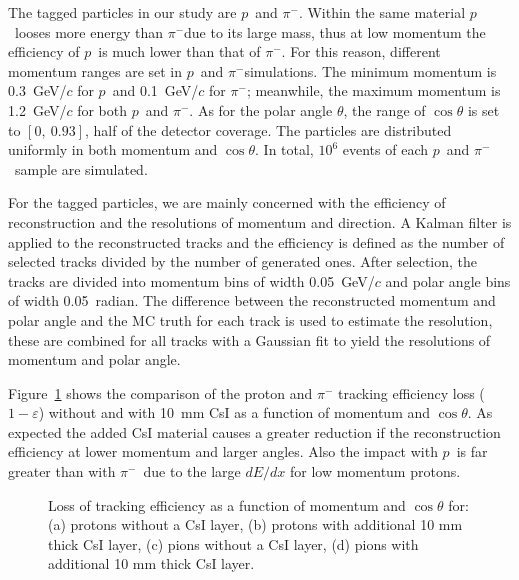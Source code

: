 \documentclass[aps,preprint,showkeys,superscriptaddress]{revtex4}
\newcommand{\pp}{$p$}
\newcommand{\pim}{$\pi^-$}
\begin{document}
The tagged particles in our study are \pp\ and \pim. Within the same material 
\pp\ looses more energy than \pim due to its large mass, thus at low
momentum the efficiency of \pp\ is much lower than that of \pim. For this
reason, different momentum ranges are set in \pp\ and \pim simulations. The
minimum momentum is 0.3~GeV/$c$ for \pp\ and 0.1~GeV/$c$ for \pim; meanwhile,
the maximum momentum is 1.2~GeV/$c$ for both \pp\ and \pim. As for the polar
angle $\theta$, the range of $\cos\theta$ is set to $[0,~0.93]$, half of the
detector coverage. The particles are distributed uniformly in both momentum and
$\cos\theta$. In total, $10^6$ events of each \pp\ and \pim\ sample are
simulated.
        
For the tagged particles, we are mainly concerned with the efficiency of
reconstruction and the resolutions of momentum and direction. A Kalman filter is
applied to the reconstructed tracks and the efficiency is defined as the number
of selected tracks divided by the number of generated ones. After selection,
the tracks are divided into momentum bins of width 0.05~GeV/$c$ 
and polar angle bins of width 0.05~radian.
The difference between the reconstructed momentum and polar angle and the MC truth 
for each track is used to estimate the resolution, these are combined for all 
tracks with a Gaussian fit to yield the resolutions of momentum and polar angle.
        
Figure~\ref{tracking} shows the comparison of the proton and $\pi^-$ tracking
efficiency loss ($1-\varepsilon$) without and with 10~mm CsI as a function of
momentum and $\cos\theta$. As expected the added CsI material 
causes a greater reduction if the reconstruction efficiency at lower momentum 
and larger angles. Also the impact with \pp\ is far greater than with \pim\ 
due to the large $dE/dx$ for low momentum protons.
        
        \begin{figure}[htbp]
        	\centering  %
        	\subfigbottomskip=2pt %
        	\subfigcapskip=-5pt %
        	\caption{ Loss of tracking efficiency as a function of momentum and $\cos\theta$ for: 
(a) protons without a CsI layer, 
(b) protons with additional 10 mm thick CsI layer, 
(c) pions without a CsI layer, 
(d) pions with additional 10 mm thick CsI layer.  }
        	\label{tracking}
        \end{figure}
        
\end{document}
